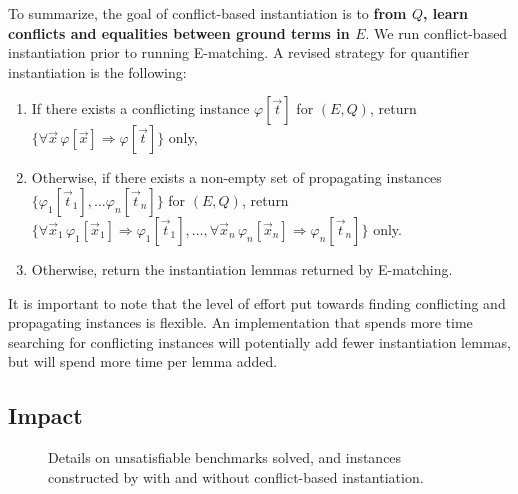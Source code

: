\documentclass{easychair}
\begin{document}
To summarize, the goal of conflict-based instantiation is to {\bf from $Q$, 
learn conflicts and equalities between ground terms in $E$}.
We run conflict-based instantiation prior to running E-matching.
A revised strategy for quantifier instantiation is the following:
\begin{enumerate}
\item If there exists a conflicting instance $\varphi[ \vec t ]$ for $( E, Q )$, 
return $\{ \forall \vec x\, \varphi[ \vec x ] \Rightarrow \varphi[ \vec t ] \}$ only,
\item Otherwise, if there exists a non-empty set of propagating instances $\{ \varphi_1[ \vec t_1 ], \ldots \varphi_n[ \vec t_n ] \}$ for $( E, Q )$,
return $\{ \forall \vec x_1\, \varphi_1[ \vec x_1 ] \Rightarrow \varphi_1[ \vec t_1 ], \ldots, \forall \vec x_n\, \varphi_n[ \vec x_n ] \Rightarrow \varphi_n[ \vec t_n ] \}$ only.
\item Otherwise, return the instantiation lemmas returned by E-matching.
\end{enumerate}
It is important to note that the level of effort put towards 
finding conflicting and propagating instances is flexible.
An implementation that spends more time searching for conflicting instances will potentially add fewer instantiation lemmas,
but will spend more time per lemma added.

\subsection{Impact}

\begin{figure}[t]
\centering
{}
\caption{
Details on unsatisfiable benchmarks solved, and instances constructed by \cvc with and without conflict-based instantiation.
}
\label{fig:results-inst-detail}
\end{figure}
\end{document}
